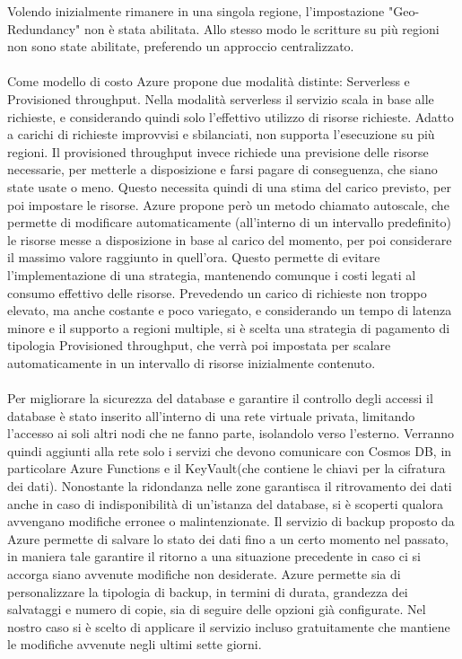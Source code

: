 Volendo inizialmente rimanere in una singola regione,
l'impostazione "Geo-Redundancy" non è stata abilitata.
Allo stesso modo le scritture su più regioni non sono state abilitate,
preferendo un approccio centralizzato.\\
\\
Come modello di costo Azure propone due modalità distinte: Serverless e Provisioned throughput.
Nella modalità serverless il servizio scala in base alle richieste,
e considerando quindi solo l'effettivo utilizzo di risorse richieste.
Adatto a carichi di richieste improvvisi e sbilanciati,
non supporta l'esecuzione su più regioni.
Il provisioned throughput invece richiede una previsione delle risorse necessarie,
per metterle a disposizione e farsi pagare di conseguenza, che siano state usate o meno.
Questo necessita quindi di una stima del carico previsto,
per poi impostare le risorse.
Azure propone però un metodo chiamato autoscale, 
che permette di modificare automaticamente (all'interno di un intervallo predefinito)
le risorse messe a disposizione in base al carico del momento,
per poi considerare il massimo valore raggiunto in quell'ora.
Questo permette di evitare l'implementazione di una strategia,
mantenendo comunque i costi legati al consumo effettivo delle risorse.
Prevedendo un carico di richieste non troppo elevato,
ma anche costante e poco variegato, 
e considerando un tempo di latenza minore e il supporto a regioni multiple,
si è scelta una strategia di pagamento di tipologia Provisioned throughput,
che verrà poi impostata per scalare automaticamente in un intervallo di risorse inizialmente contenuto.\\
\\
Per migliorare la sicurezza del database e garantire il controllo degli accessi
il database è stato inserito all'interno di una rete virtuale privata,
limitando l'accesso ai soli altri nodi che ne fanno parte,
isolandolo verso l'esterno.
Verranno quindi aggiunti alla rete solo i servizi che devono comunicare con Cosmos DB,
in particolare Azure Functions e il KeyVault(che contiene le chiavi per la cifratura dei dati).
Nonostante la ridondanza nelle zone garantisca il ritrovamento dei dati 
anche in caso di indisponibilità di un'istanza del database,
si è scoperti qualora avvengano modifiche erronee o malintenzionate.
Il servizio di backup proposto da Azure permette di salvare lo stato dei dati 
fino a un certo momento nel passato, 
in maniera tale garantire il ritorno a una situazione precedente 
in caso ci si accorga siano avvenute modifiche non desiderate. 
Azure permette sia di personalizzare la tipologia di backup,
in termini di durata, grandezza dei salvataggi e numero di copie,
sia di seguire delle opzioni già configurate.
Nel nostro caso si è scelto di applicare il servizio incluso gratuitamente
che mantiene le modifiche avvenute negli ultimi sette giorni.\\


